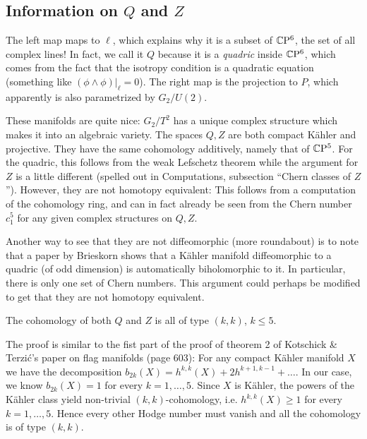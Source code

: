 \documentclass{scrartcl}
\begin{document}
\subsection{Information on $Q$ and $Z$}

The left map maps to $\ell$, which explains why it is a subset of $\mathbb{C}\mathrm{P}^6$, the set of all complex lines! In fact, we call it $Q$ because it is a \emph{quadric} inside $\mathbb{C}\mathrm{P}^6$, which comes from the fact that the isotropy condition is a quadratic equation (something like $(\phi\wedge\phi)\big|_\ell=0$).
The right map is the projection to $P$, which apparently is also parametrized by $G_2/U(2)$.

\medskip

These manifolds are quite nice: $G_2/T^2$ has a unique complex structure which makes it into an algebraic variety. The spaces $Q,Z$ are both compact K\"{a}hler and projective. They have the same cohomology additively, namely that of $\mathbb{C}\mathrm{P}^5$. For the quadric, this follows from the weak Lefschetz theorem while the argument for $Z$ is a little different (spelled out in Computations, subsection ``Chern classes of $Z$''). However, they are not homotopy equivalent: This follows from a computation of the cohomology ring, and can in fact already be seen from the Chern number $c_1^5$ for any given complex structures on $Q,Z$.

\begin{rem}
	Another way to see that they are not diffeomorphic (more roundabout) is to note that a paper by Brieskorn shows that a K\"{a}hler manifold diffeomorphic to a quadric (of odd dimension) is automatically biholomorphic to it. In particular, there is only one set of Chern numbers. This argument could perhaps be modified to get that they are not homotopy equivalent.
\end{rem}

\begin{prop}
	The cohomology of both $Q$ and $Z$ is all of type $(k,k)$, $k\leq 5$.
\end{prop}
\begin{myproof}
	The proof is similar to the fist part of the proof of theorem 2 of Kotschick \& Terzi\'{c}'s paper on flag manifolds (page 603): For any compact K\"{a}hler manifold $X$ we have the decomposition $b_{2k}(X)=h^{k,k}(X)+2h^{k+1,k-1}+\dots$. In our case, we know $b_{2k}(X)=1$ for every $k=1,\dots,5$. Since $X$ is K\"{a}hler, the powers of the K\"{a}hler class yield non-trivial $(k,k)$-cohomology, i.e. $h^{k,k}(X)\geq 1$ for every $k=1,\dots,5$. Hence every other Hodge number must vanish and all the cohomology is of type $(k,k)$.
\end{myproof}
\end{document}
